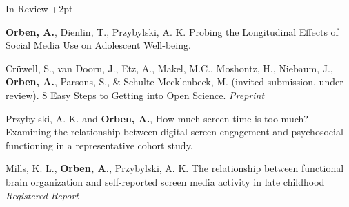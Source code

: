 \documentclass{resume} %
\begin{document}
\begin{rSection}{In Review} \itemsep +2pt

\item \textbf{Orben, A.}, Dienlin, T., Przybylski, A. K. Probing the Longitudinal Effects of Social Media Use on Adolescent Well-being.

\item Cr{\"u}well, S., van Doorn, J., Etz, A., Makel, M.C., Moshontz, H., Niebaum, J., \textbf{Orben, A.}, Parsons, S., \& Schulte-Mecklenbeck, M. (invited submission, under review). 8 Easy Steps to Getting into Open Science. \textit{{\href{https://psyarxiv.com/cfzyx}{Preprint}}}

\item Przybylski, A. K. and  \textbf{Orben, A.}, How much screen time is too much? Examining the relationship between digital screen engagement and psychosocial functioning in a representative cohort study.

\item Mills, K. L.,  \textbf{Orben, A.}, Przybylski, A. K. The relationship between functional brain organization and self-reported screen media activity in late childhood \textit{Registered Report}

\end{rSection}




\end{document}
